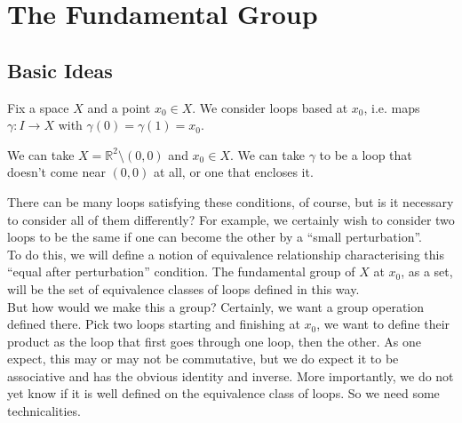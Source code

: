 \section{The Fundamental Group}
\subsection{Basic Ideas}
Fix a space $X$ and a point $x_0\in X$.
We consider loops based at $x_0$, i.e. maps $\gamma:I\to X$ with $\gamma(0)=\gamma(1)=x_0$.
\begin{example}
    We can take $X=\mathbb R^2\setminus{(0,0)}$ and $x_0\in X$.
    We can take $\gamma$ to be a loop that doesn't come near $(0,0)$ at all, or one that encloses it.
\end{example}
There can be many loops satisfying these conditions, of course, but is it necessary to consider all of them differently?
For example, we certainly wish to consider two loops to be the same if one can become the other by a ``small perturbation''.\\
To do this, we will define a notion of equivalence relationship characterising this ``equal after perturbation'' condition.
The fundamental group of $X$ at $x_0$, as a set, will be the set of equivalence classes of loops defined in this way.\\
But how would we make this a group?
Certainly, we want a group operation defined there.
Pick two loops starting and finishing at $x_0$, we want to define their product as the loop that first goes through one loop, then the other.
As one expect, this may or may not be commutative, but we do expect it to be associative and has the obvious identity and inverse.
More importantly, we do not yet know if it is well defined on the equivalence class of loops.
So we need some technicalities.
